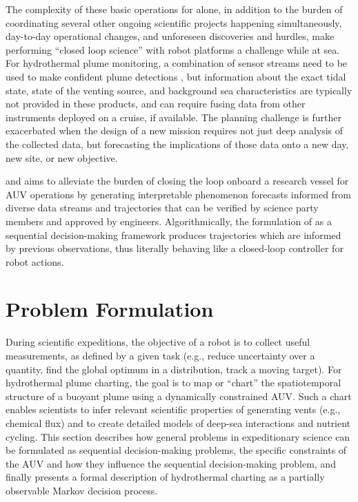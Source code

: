 The complexity of these basic operations for \Sentry alone, in addition to the burden of coordinating several other ongoing scientific projects happening simultaneously, day-to-day operational changes, and unforeseen discoveries and hurdles, make performing ``closed loop science'' with robot platforms a challenge while at sea. For hydrothermal plume monitoring, a combination of sensor streams need to be used to make confident plume detections \autocite{jakuba2007stochastic}, but information about the exact tidal state, state of the venting source, and background sea characteristics are typically not provided in these products, and can require fusing data from other instruments deployed on a cruise, if available. The planning challenge is further exacerbated when the design of a new mission requires not just deep analysis of the collected data, but forecasting the implications of those data onto a new day, new site, or new objective. 

\PHUMES and \PHORTEX aims to alleviate the burden of closing the loop onboard a research vessel for AUV operations by generating interpretable phenomenon forecasts informed from diverse data streams and trajectories that can be verified by science party members and approved by \Sentry engineers. Algorithmically, the formulation of \PHORTEX as a sequential decision-making framework produces trajectories which are informed by previous observations, thus literally behaving like a closed-loop controller for robot actions. %

\section{Problem Formulation}
\label{sec:problem}
During scientific expeditions, the objective of a robot is to collect useful measurements, as defined by a given task (e.g., reduce uncertainty over a quantity, find the global optimum in a distribution, track a moving target). For hydrothermal plume charting, the goal is to map or ``chart'' the spatiotemporal structure of a buoyant plume using a dynamically constrained AUV. Such a chart enables scientists to infer relevant scientific properties of generating vents (e.g., chemical flux) and to create detailed models of deep-sea interactions and nutrient cycling. This section describes how general problems in expeditionary science can be formulated as sequential decision-making problems, the specific constraints of the AUV \Sentry and how they influence the sequential decision-making problem, and finally presents a formal description of hydrothermal charting as a partially observable Markov decision process. 

